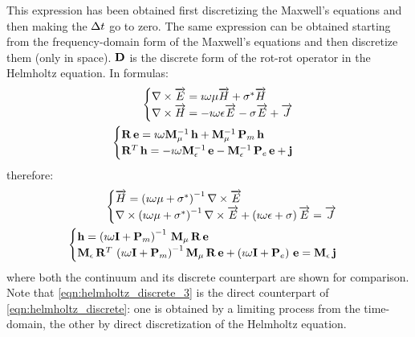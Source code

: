 This expression has been obtained first discretizing the Maxwell's
equations and then making the $\Delta t$ go to zero. The same
expression can be obtained starting from the frequency-domain form of
the Maxwell's equations and then discretize them (only in
space). $\mathbf{D}$ is the discrete form of the rot-rot operator in
the Helmholtz equation. In formulas:
\begin{align}
  \begin{cases}
    {\nabla\times \overrightarrow{E}} = \imath \omega \mu \overrightarrow{H} + \sigma^* \overrightarrow{H} \\
    {\nabla \times \overrightarrow{H}} = -\imath \omega \epsilon \overrightarrow{E} - \sigma \overrightarrow{E} + \overrightarrow{J}
  \end{cases} \notag \\
  \begin{cases}
    {\mathbf{R}\,\mathbf{e}} = \imath \omega
    {\mathbf{M}_\mu^{-1}\,\mathbf{h}} +
    {\mathbf{M}_\mu^{-1}\,{\mathbf{P}_m\,\mathbf{h}}} \\
    {{\mathbf{R}}^T\,\mathbf{h}} = -\imath \omega
    {\mathbf{M}_\epsilon^{-1}\,\mathbf{e}} -
    {\mathbf{M}_\epsilon^{-1}\,{\mathbf{P}_e\,\mathbf{e}}} +
    \mathbf{j} 
  \end{cases} \label{eqn:helmholtz_discrete_2}
\end{align}
therefore:
\begin{align}
  \begin{cases}
    \overrightarrow{H} = \left( \imath \omega \mu + \sigma^* \right)^{-1} {\nabla \times \overrightarrow{E}} \\
    {\nabla \times \left( \imath \omega \mu + \sigma^* \right)^{-1} {\nabla \times \overrightarrow{E}}} +
    \left( \imath \omega \epsilon + \sigma \right) \overrightarrow{E} = \overrightarrow{J}
  \end{cases} \notag \\
  \begin{cases} 
    \mathbf{h} = {{{\left( \imath \omega \mathbf{I} +
    \mathbf{P}_m
    \right)^{-1}\,\mathbf{M}_\mu}\,\mathbf{R}}\,\mathbf{e}} \\
    {{{{{\mathbf{M}_\epsilon\,{\mathbf{R}}^T}\,\left(\imath
    \omega \mathbf{I} + \mathbf{P}_m
    \right)^{-1}}\,\mathbf{M}_\mu}\,\mathbf{R}}\,\mathbf{e}} +
    {\left( \imath \omega \mathbf{I} + \mathbf{P}_e \right)\,\mathbf{e}} =
    {\mathbf{M}_\epsilon\,\mathbf{j}}
  \end{cases} \label{eqn:helmholtz_discrete_3}
\end{align}
where both the continuum and its discrete counterpart are shown for
comparison. Note that \eqref{eqn:helmholtz_discrete_3} is the direct
counterpart of \eqref{eqn:helmholtz_discrete}: one is obtained by a
limiting process from the time-domain, the other by direct
discretization of the Helmholtz equation.

